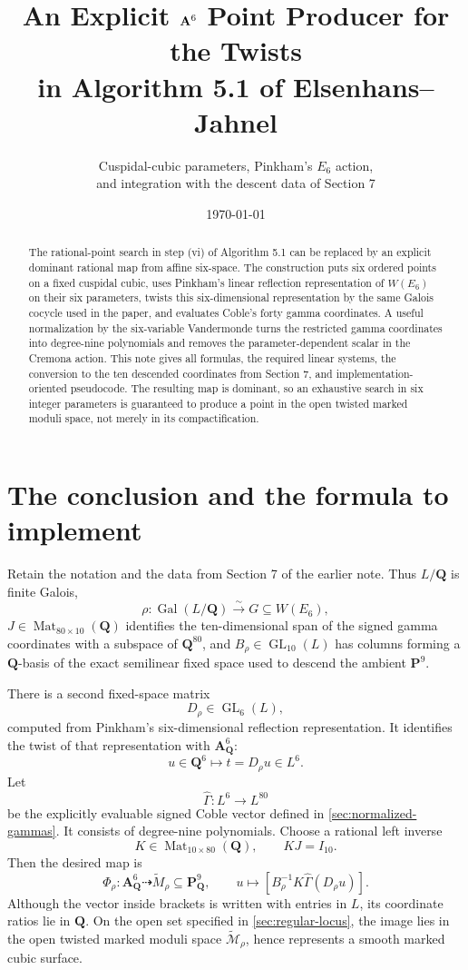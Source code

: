 \documentclass[11pt]{article}
\title{An Explicit $\Aff^6$ Point Producer for the Twists\\
in Algorithm 5.1 of Elsenhans--Jahnel}
\author{Cuspidal-cubic parameters, Pinkham's $E_6$ action,\\
and integration with the descent data of Section 7}
\date{\today}
\newcommand{\QQ}{\mathbf{Q}}
\newcommand{\PP}{\mathbf{P}}
\newcommand{\Aff}{\mathbf{A}}
\newcommand{\Gal}{\operatorname{Gal}}
\newcommand{\Mat}{\operatorname{Mat}}
\newcommand{\tcM}{\widetilde{\mathcal{M}}}
\newcommand{\tM}{\widetilde{M}}
\newcommand{\Gamhat}{\widehat{\Gamma}}
\begin{document}
\maketitle

\begin{abstract}
The rational-point search in step (vi) of Algorithm 5.1 can be replaced by an
explicit dominant rational map from affine six-space.  The construction puts six
ordered points on a fixed cuspidal cubic, uses Pinkham's linear reflection
representation of $W(E_6)$ on their six parameters, twists this six-dimensional
representation by the same Galois cocycle used in the paper, and evaluates Coble's
forty gamma coordinates.  A useful normalization by the six-variable Vandermonde
turns the restricted gamma coordinates into degree-nine polynomials and removes
the parameter-dependent scalar in the Cremona action.  This note gives all formulas,
the required linear systems, the conversion to the ten descended coordinates from
Section 7, and implementation-oriented pseudocode.  The resulting map is dominant,
so an exhaustive search in six integer parameters is guaranteed to produce a point
in the open twisted marked moduli space, not merely in its compactification.
\end{abstract}

\tableofcontents

\section{The conclusion and the formula to implement}

Retain the notation and the data from Section 7 of the earlier note.  Thus
$L/\QQ$ is finite Galois,
\[
  \rho:\Gal(L/\QQ)\xrightarrow{\sim}G\subseteq W(E_6),
\]
$J\in\Mat_{80\times10}(\QQ)$ identifies the ten-dimensional span of the
signed gamma coordinates with a subspace of $\QQ^{80}$, and
$B_\rho\in\operatorname{GL}_{10}(L)$ has columns forming a $\QQ$-basis of the
exact semilinear fixed space used to descend the ambient $\PP^9$.

There is a second fixed-space matrix
\[
  D_\rho\in\operatorname{GL}_6(L),
\]
computed from Pinkham's six-dimensional reflection representation.  It identifies
the twist of that representation with $\Aff^6_\QQ$:
\[
  u\in\QQ^6\longmapsto t=D_\rho u\in L^6.
\]
Let
\[
  \Gamhat:L^6\longrightarrow L^{80}
\]
be the explicitly evaluable signed Coble vector defined in
\cref{sec:normalized-gammas}.  It consists of degree-nine polynomials.  Choose a
rational left inverse
\[
  K\in\Mat_{10\times80}(\QQ),\qquad KJ=I_{10}.
\]
Then the desired map is
\begin{equation}
 \boxed{
 \Phi_\rho:\Aff^6_\QQ\dashrightarrow\tM_\rho\subseteq\PP^9_\QQ,
 \qquad
 u\longmapsto
 \left[B_\rho^{-1}K\Gamhat(D_\rho u)\right].
 }
 \label{eq:main-map}
\end{equation}
Although the vector inside brackets is written with entries in $L$, its coordinate
ratios lie in $\QQ$.  On the open set specified in \cref{sec:regular-locus}, the
image lies in the open twisted marked moduli space $\tcM_\rho$, hence represents a
smooth marked cubic surface.
\end{document}
